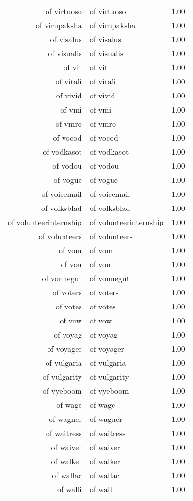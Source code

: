 \begin{table}[ht]
\begin{tabular}{rlr}
  of virtuoso & of virtuoso & 1.00 \\ 
  of virupaksha & of virupaksha & 1.00 \\ 
  of visalus & of visalus & 1.00 \\ 
  of visualis & of visualis & 1.00 \\ 
  of vit & of vit & 1.00 \\ 
  of vitali & of vitali & 1.00 \\ 
  of vivid & of vivid & 1.00 \\ 
  of vmi & of vmi & 1.00 \\ 
  of vmro & of vmro & 1.00 \\ 
  of vocod & of vocod & 1.00 \\ 
  of vodkasot & of vodkasot & 1.00 \\ 
  of vodou & of vodou & 1.00 \\ 
  of vogue & of vogue & 1.00 \\ 
  of voicemail & of voicemail & 1.00 \\ 
  of volksblad & of volksblad & 1.00 \\ 
  of volunteerinternship & of volunteerinternship & 1.00 \\ 
  of volunteers & of volunteers & 1.00 \\ 
  of vom & of vom & 1.00 \\ 
  of von & of von & 1.00 \\ 
  of vonnegut & of vonnegut & 1.00 \\ 
  of voters & of voters & 1.00 \\ 
  of votes & of votes & 1.00 \\ 
  of vow & of vow & 1.00 \\ 
  of voyag & of voyag & 1.00 \\ 
  of voyager & of voyager & 1.00 \\ 
  of vulgaria & of vulgaria & 1.00 \\ 
  of vulgarity & of vulgarity & 1.00 \\ 
  of vyeboom & of vyeboom & 1.00 \\ 
  of wage & of wage & 1.00 \\ 
  of wagner & of wagner & 1.00 \\ 
  of waitress & of waitress & 1.00 \\ 
  of waiver & of waiver & 1.00 \\ 
  of walker & of walker & 1.00 \\ 
  of wallac & of wallac & 1.00 \\ 
  of walli & of walli & 1.00 \\ 

\end{tabular}
\end{table}

